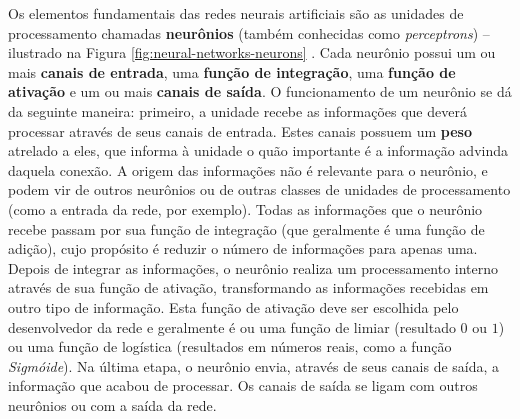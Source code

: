 Os elementos fundamentais das redes neurais artificiais são as unidades de
processamento chamadas \textbf{neurônios} (também conhecidas como
\textit{perceptrons}) -- ilustrado na Figura \ref{fig:neural-networks-neurons}
\cite[Cap. 3]{Rojas:1996:NNS:235222}.  Cada neurônio possui um ou mais
\textbf{canais de entrada}, uma \textbf{função de integração}, uma
\textbf{função de ativação} e um ou mais \textbf{canais de saída}. O
funcionamento de um neurônio se dá da seguinte maneira: primeiro, a unidade
recebe as informações que deverá processar através de seus canais de entrada.
Estes canais possuem um \textbf{peso} atrelado a eles, que informa à unidade o
quão importante é a informação advinda daquela conexão. A origem das informações
não é relevante para o neurônio, e podem vir de outros neurônios ou de outras
classes de unidades de processamento (como a entrada da rede, por exemplo).
Todas as informações que o neurônio recebe passam por sua função de integração
(que geralmente é uma função de adição), cujo propósito é reduzir o número de
informações para apenas uma.  Depois de integrar as informações, o neurônio
realiza um processamento interno através de sua função de ativação,
transformando as informações recebidas em outro tipo de informação. Esta função
de ativação deve ser escolhida pelo desenvolvedor da rede e geralmente é ou uma
função de limiar (resultado $0$ ou $1$) ou uma função de logística (resultados
em números reais, como a função \textit{Sigmóide}). Na última etapa, o neurônio
envia, através de seus canais de saída, a informação que acabou de processar. Os
canais de saída se ligam com outros neurônios ou com a saída da rede.

